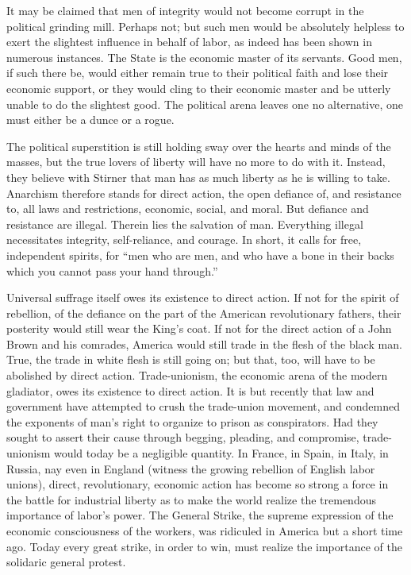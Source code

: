 It may be claimed that men of integrity would not become
corrupt in the political grinding mill. Perhaps not; but such men
would be absolutely helpless to exert the slightest influence in
behalf of labor, as indeed has been shown in numerous instances. The
State is the economic master of its servants. Good men, if such there
be, would either remain true to their political faith and lose their
economic support, or they would cling to their economic master and be
utterly unable to do the slightest good. The political arena leaves
one no alternative, one must either be a dunce or a rogue.

The political superstition is still holding sway over the hearts and
minds of the masses, but the true lovers of liberty will have no more
to do with it. Instead, they believe with Stirner that man has as much
liberty as he is willing to take. Anarchism therefore stands for
direct action, the open defiance of, and resistance to, all laws and
restrictions, economic, social, and moral. But defiance and resistance
are illegal. Therein lies the salvation of man. Everything illegal
necessitates integrity, self-reliance, and courage. In short, it calls
for free, independent spirits, for ``men who are men, and who have a
bone in their backs which you cannot pass your hand through.''

Universal suffrage itself owes its existence to direct action. If not
for the spirit of rebellion, of the defiance on the part of the
American revolutionary fathers, their posterity would still wear the
King's coat. If not for the direct action of a John  Brown
and his comrades, America would still trade in the flesh of the black
man. True, the trade in white flesh is still going on; but that, too,
will have to be abolished by direct action. Trade-unionism, the
economic arena of the modern gladiator, owes its existence to direct
action. It is but recently that law and government have attempted to
crush the trade-union movement, and condemned the exponents of man's
right to organize to prison as conspirators. Had they sought to assert
their cause through begging, pleading, and compromise, trade-unionism
would today be a negligible quantity. In France, in Spain, in Italy,
in Russia, nay even in England (witness the growing rebellion of
English labor unions), direct, revolutionary, economic action has
become so strong a force in the battle for industrial liberty as to
make the world realize the tremendous importance of labor's power. The
General Strike, the supreme expression of the economic consciousness
of the workers, was ridiculed in America but a short time ago. Today
every great strike, in order to win, must realize the importance of
the solidaric general protest.

